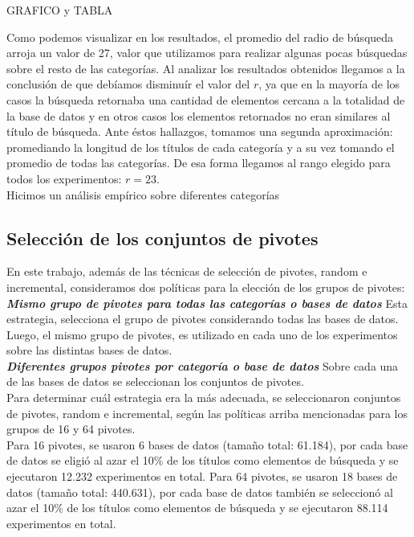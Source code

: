 GRAFICO y TABLA %

Como podemos visualizar en los resultados, el promedio del radio de b\'usqueda arroja un valor de 27, valor que utilizamos para realizar algunas pocas b\'usquedas sobre el resto de las categor\'ias. Al analizar los resultados obtenidos llegamos a la conclusi\'on de que deb\'iamos disminu\'ir el valor del $r$, ya que en la mayor\'ia de los casos la b\'usqueda retornaba una cantidad de elementos cercana a la totalidad de la base de datos y en otros casos los elementos retornados no eran similares al t\'itulo de b\'usqueda. Ante \'estos hallazgos, tomamos una segunda aproximaci\'on: promediando la longitud de los t\'itulos de cada categor\'ia y a su vez tomando el promedio de todas las categor\'ias.  De esa forma llegamos al rango elegido para todos los experimentos: $r=23$.\\

Hicimos un an\'alisis emp\'irico sobre diferentes categor\'ias


\subsection{Selecci\'on de los conjuntos de pivotes}

En este trabajo, adem\'as de las t\'ecnicas de selecci\'on de pivotes, random e incremental, consideramos dos pol\'iticas para la elecci\'on de los grupos de pivotes:\\

\noindent  \textit{\textbf{Mismo grupo de pivotes para todas las categor\'ias o bases de datos}}
Esta estrategia, selecciona el grupo de pivotes considerando todas las bases de datos. Luego, el mismo grupo de pivotes, es utilizado en cada uno de los experimentos sobre las distintas bases de datos.\\

\noindent  \textit{\textbf{Diferentes grupos pivotes por categor\'ia o base de datos}}
Sobre cada una de las bases de datos se seleccionan los conjuntos de pivotes.\\

Para determinar cu\'al estrategia era la m\'as adecuada, se seleccionaron conjuntos de pivotes, random e incremental, seg\'un las pol\'iticas arriba mencionadas para los grupos de 16 y 64 pivotes.\\

Para 16 pivotes, se usaron 6 bases de datos (tamaño total: 61.184), por cada base de datos se eligi\'o al azar el 10\% de los t\'itulos como elementos de b\'usqueda y se ejecutaron 12.232 experimentos en total. 
Para 64 pivotes, se usaron 18 bases de datos (tamaño total: 440.631), por cada base de datos tambi\'en se seleccion\'o al azar el 10\% de los t\'itulos como elementos de b\'usqueda y se ejecutaron 88.114 experimentos en total.\\

